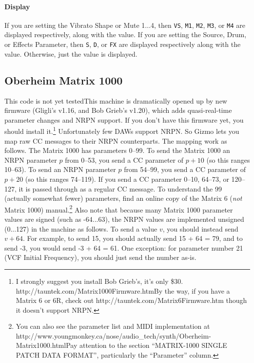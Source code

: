 \documentclass{article}
\begin{document}
\paragraph{Display}  If you are setting the Vibrato Shape or Mute 1...4, then \texttt{VS}, \texttt{M1}, \texttt{M2}, \texttt{M3}, or \texttt{M4} are displayed respectively, along with the value.  If you are setting the Source, Drum, or Effects Parameter, then \texttt{S}, \texttt{D}, or \texttt{FX} are displayed respectively along with the value.  Otherwise, just the value is displayed.


\subsection{Oberheim Matrix 1000}  {\color{red} This code is not yet tested}\quad This machine is dramatically opened up by new firmware (Gligli's v1.16, and Bob Grieb's v1.20), which adds quasi-real-time parameter changes and NRPN support.  If you don't have this firmware yet, you should install it.\footnote{I strongly suggest you install Bob Grieb's, it's only \$30.  http:/\!/tauntek.com/Matrix1000Firmware.htm\quad By the way, if you have a Matrix 6 or 6R, check out http:/\!/tauntek.com/Matrix6Firmware.htm though it doesn't support NRPN.}  Unfortunately few DAWs support NRPN.  So Gizmo lets you map raw CC messages to their NRPN counterparts.  The mapping work as follows.  The Matrix 1000 has parameters 0--99.  To send the Matrix 1000 an NRPN parameter \(p\) from 0--53, you send a CC parameter of \(p+10\) (so this ranges 10--63).  To send an NRPN parameter \(p\) from 54--99, you send a CC parameter of \(p+20\) (so this ranges 74--119).  If you send a CC parameter 0--10, 64--73, or 120--127, it is passed through as a regular CC message.  To understand the 99 (actually somewhat fewer) parameters, find an online copy of the Matrix 6 ({\it not} Matrix 1000) manual.\footnote{You can also see the parameter list and MIDI implementation at http:/\!/www.youngmonkey.ca/nose/audio\_tech/synth/Oberheim-Matrix1000.html\quad Pay attention to the section ``MATRIX-1000 SINGLE PATCH DATA FORMAT'', particularly the ``Parameter'' column.}  Also note that because many Matrix 1000 parameter values are signed (such as -64...63), the NRPN values are implemented unsigned (0...127) in the machine as follows.  To send a value \(v\), you should instead send \(v+64\).  For example, to send 15, you should actually send 15 + 64 = 79, and to send -3, you would send -3 + 64 = 61.  One exception: for parameter number 21 (VCF Initial Frequency), you should just send the number as-is.
\end{document}
